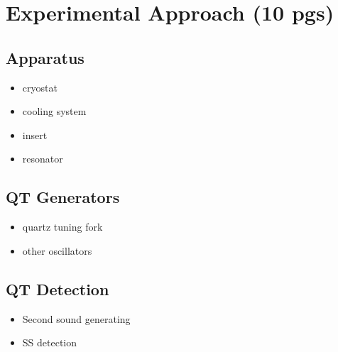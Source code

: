 \documentclass[a4paper, 12pt]{report}
\newcommand{\<}{\langle} %
\renewcommand{\>}{\rangle} %
\begin{document}
%
% 
%
% 
%
%
%
% 
%
% 


\pagestyle{plain}
\setcounter{page}{1}

\tableofcontents


%
%
%
%

\chapter{Experimental Approach (10 pgs)}

\section{Apparatus}
\begin{itemize}
	\item cryostat
	\item cooling system
	\item insert
	\item resonator
\end{itemize}

\section{QT Generators}
\begin{itemize}
	\item quartz tuning fork
	\item other oscillators
\end{itemize}

\section{QT Detection}
\begin{itemize}
	\item Second sound generating
	\item SS detection
\end{itemize}
\end{document}
